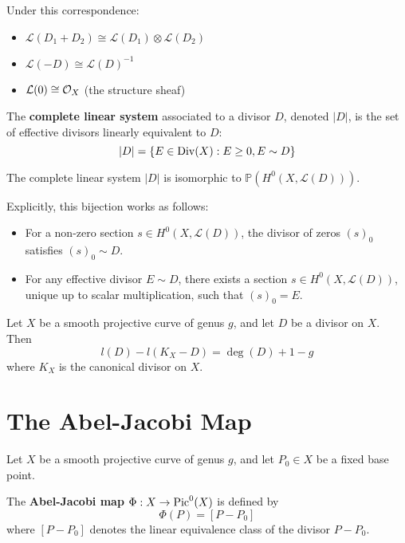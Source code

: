\documentclass[12pt]{article}
\begin{document}
Under this correspondence:
\begin{itemize}
    \item $\mathcal{L}(D_1 + D_2) \cong \mathcal{L}(D_1) \otimes \mathcal{L}(D_2)$
    \item $\mathcal{L}(-D) \cong \mathcal{L}(D)^{-1}$
    \item $\mathcal{L}(0) \cong {\mathcal{O}}_X$ (the structure sheaf)
\end{itemize}

\begin{definition}
    The \textbf{complete linear system} associated to a divisor $D$, denoted $|D|$, is the set of effective divisors linearly equivalent to $D$:
    \[|D| = \{E \in \operatorname{Div}(X) : E \geq 0, E \sim D\}\]
\end{definition}

\begin{proposition}
    The complete linear system $|D|$ is isomorphic to $\mathbb{P}(H^0(X, \mathcal{L}(D)))$.
\end{proposition}

Explicitly, this bijection works as follows:
\begin{itemize}
    \item For a non-zero section $s \in H^0(X, \mathcal{L}(D))$, the divisor of zeros $(s)_0$ satisfies $(s)_0 \sim D$.
    \item For any effective divisor $E \sim D$, there exists a section $s \in H^0(X, \mathcal{L}(D))$, unique up to scalar multiplication, such that $(s)_0 = E$.
\end{itemize}

\begin{theorem}
    Let $X$ be a smooth projective curve of genus $g$, and let $D$ be a divisor on $X$. Then
    \[l(D) - l(K_X - D) = \deg(D) + 1 - g\]
    where $K_X$ is the canonical divisor on $X$.
\end{theorem}

\section{The Abel-Jacobi Map}
Let $X$ be a smooth projective curve of genus $g$, and let $P_0 \in X$ be a fixed base point.

\begin{definition}
    The \textbf{Abel-Jacobi map} $\Phi: X \to \operatorname{Pic}^0(X)$ is defined by
    \[\Phi(P) = [P - P_0]\]
    where $[P - P_0]$ denotes the linear equivalence class of the divisor $P - P_0$.
\end{definition}
\end{document}
